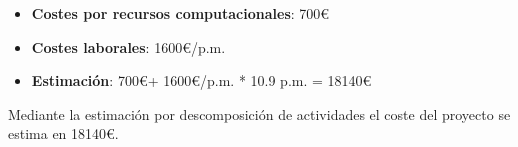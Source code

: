 \begin{itemize}
    \item \textbf{Costes por recursos computacionales}: 700\euro
    \item \textbf{Costes laborales}: 1600\euro/p.m.
    \item \textbf{Estimación}: 700\euro + 1600\euro/p.m. * 10.9 p.m. = 18140\euro
\end{itemize}

Mediante la estimación por descomposición de actividades el coste del proyecto se estima en 18140\euro.